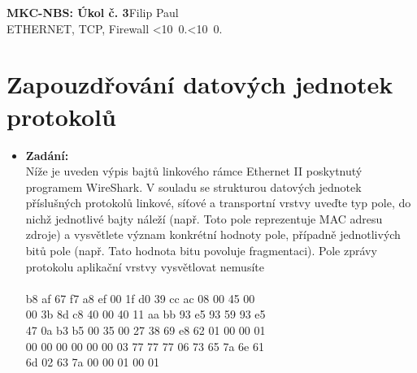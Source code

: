 \documentclass[10pt, a4paper]{article}%
\def\mydate{\leavevmode\hbox{\twodigits\day.\twodigits\month.\the\year}}
\def\twodigits#1{\ifnum#1<10 0\fi\the#1}
\begin{document}
\begin{flushleft}%
	\textbf{\Large{MKC-NBS: Úkol č. 3}}\hfill Filip Paul\\
	\large{ETHERNET, TCP, Firewall \hfill\mydate}
\end{flushleft}
\section*{\large{\textbf{Zapouzdřování datových jednotek protokolů}}}
	\begin{itemize}[label={}]
		\item \textbf{Zadání:}\\
		Níže je uveden výpis bajtů linkového rámce Ethernet II poskytnutý programem WireShark. V
		souladu se strukturou datových jednotek příslušných protokolů linkové, síťové a transportní vrstvy
		uveďte typ pole, do nichž jednotlivé bajty náleží (např. Toto pole reprezentuje MAC adresu
		zdroje) a vysvětlete význam konkrétní hodnoty pole, případně jednotlivých bitů pole (např. Tato
		hodnota bitu povoluje fragmentaci). Pole zprávy protokolu aplikační vrstvy vysvětlovat nemusíte\\\\

		 b8 af 67 f7 a8 ef 00 1f d0 39 cc ac 08 00 45 00 \\
		 00 3b 8d c8 40 00 40 11 aa bb 93 e5 93 59 93 e5 \\
		 47 0a b3 b5 00 35 00 27 38 69 e8 62 01 00 00 01 \\
		 00 00 00 00 00 00 03 77 77 77 06 73 65 7a 6e 61 \\
		 6d 02 63 7a 00 00 01 00 01 \\
		

\end{itemize}
\end{document}
